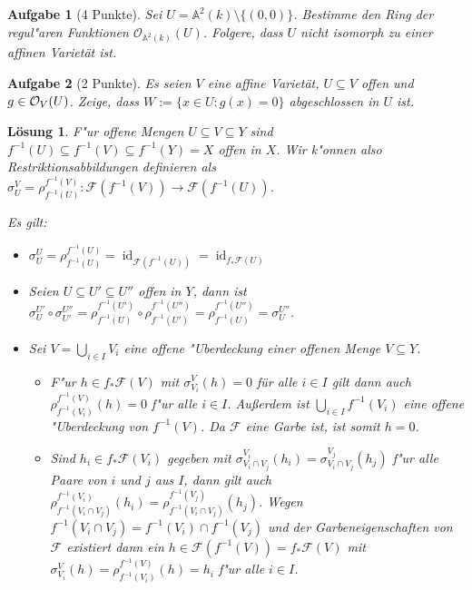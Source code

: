 \documentclass[a4paper, 12pt, numbers=noendperiod, chapterprefix=true, headsepline]{scrbook}
\theoremstyle{break}
\newtheorem{Aufg}{Aufgabe}
\newtheorem{Loes}{L\"osung}
\theoremstyle{nonumberbreak}
\theoremstyle{nonumberplain}
\DeclareMathOperator{\id}{id}
\newcommand{\A}{\mathbb{A}}
\newcommand{\calF}{\mathcal{F}}
\newcommand{\calO}{\mathcal{O}}
\begin{document}
\begin{Aufg}[4 Punkte]
Sei $U = \A^2(k)\setminus \{(0,0)\}$. Bestimme den Ring der regul"aren Funktionen $\calO_{\A^2(k)}(U)$. Folgere, dass $U$ nicht isomorph zu einer affinen Variet\"at ist.
\end{Aufg}

\begin{Aufg}[2 Punkte]
Es seien $V$ eine affine Variet\"at, $U\subseteq V$ offen und $g\in{\cal O}_V(U)$. Zeige, dass $W:= \{x\in U: g(x)=0\}$ abgeschlossen in $U$ ist.
\end{Aufg}

\begin{Loes}
F"ur offene Mengen $U \subseteq V \subseteq Y$ sind $f^{-1}(U) \subseteq f^{-1}(V) \subseteq f^{-1}(Y) = X$ offen in $X$. Wir k"onnen also Restriktionsabbildungen definieren als $\sigma^V_U = \rho^{f^{-1}(V)}_{f^{-1}(U)}: \calF(f^{-1}(V)) \to \calF(f^{-1}(U))$.

Es gilt:
\begin{itemize}
\item
	$\sigma^U _U = \rho^{f^{-1}(U)}_{f^{-1}(U)} = \id_{\calF(f^{-1}(U))} = \id_{f_*\calF(U)}$
\item
	Seien $U \subseteq U' \subseteq U''$ offen in $Y$, dann ist
	$\sigma^{U'}_U \circ \sigma^{U''}_{U'} = \rho^{f^{-1}(U')}_{f^{-1}(U)}	 \circ \rho^{f^{-1}(U'')}_{f^{-1}(U')} = \rho^{f^{-1}(U'')}_{f^{-1}(U)} = \sigma^{U''}_{U}$.
\item
	Sei $V = \bigcup_{i \in I} V_i$ eine offene "Uberdeckung einer offenen Menge $V \subseteq Y$. 
	\begin{itemize}
	\item
		F"ur $h \in f_*\calF(V)$ mit $\sigma^V_{V_i}(h) = 0$ für alle $i \in I$ gilt dann auch $\rho^{f^{-1}(V)}_{f^{-1}(V_i)}(h) = 0$ f"ur alle $i \in I$. Außerdem ist $\bigcup_{i \in I} f^{-1}(V_i)$ eine offene "Uberdeckung von $f^{-1}(V)$. Da $\calF$ eine Garbe ist, ist somit $h = 0$.
	\item
		Sind $h_i \in f_*\calF(V_i)$ gegeben mit $\sigma^{V_i}_{V_i \cap V_j} (h_i) = \sigma^{V_j}_{V_i \cap V_j} (h_j)$ f"ur alle Paare von $i$ und $j$ aus $I$, dann gilt auch $\rho^{f^{-1}(V_i)}_{f^{-1}(V_i \cap V_j)} (h_i) = \rho^{f^{-1}(V_j)}_{f^{-1}(V_i \cap V_j)} (h_j)$. Wegen $f^{-1}(V_i \cap V_j) = f^{-1}(V_i) \cap f^{-1}(V_j)$ und der Garbeneigenschaften von $\calF$ existiert dann ein $h \in \calF(f^{-1}(V))= f_*\calF(V)$ mit $\sigma^V_{V_i}(h) = \rho^{f^{-1}(V)}_{f^{-1}(V_i)}(h) = h_i$ f"ur alle $i\in I$.
\end{itemize}\end{itemize}\end{Loes}
\end{document}
